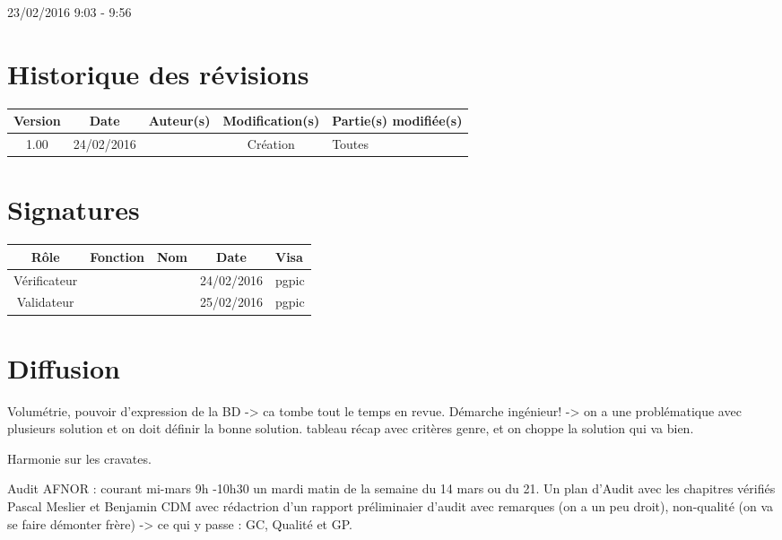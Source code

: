 \documentclass [a4paper] {article}
\begin{document}
\rhead{}

23/02/2016
\hfill   
\hfill 	9:03 - 9:56 				%



\section*{Historique des révisions}
\begin{center}
			\begin{tabular}{| c | c | c | c | p{4cm} |}
				\hline
				\rowcolor{Gray}
				Version & Date & Auteur(s) & Modification(s) & Partie(s) modifiée(s)		 \\
				\hline
				1.00 & 24/02/2016 & \Pierre & Création & Toutes \\
		\hline		
			\end{tabular}
		\end{center}

\section*{Signatures}

		\begin{center}
			\begin{tabular}{| c | c | c | c | p{4cm} |}
				\hline
				\rowcolor{Gray}
				Rôle & Fonction & Nom & Date & Visa		 \\
				\hline
				Vérificateur & \RQA & \Kafui & 24/02/2016 & pgpic \\[30pt]
				\hline
				Validateur & \CP & \Sergi & 25/02/2016 & pgpic \\[30pt]	
				\hline
			\end{tabular}
		\end{center}


\section{Diffusion}
Volumétrie, pouvoir d'expression de la BD -> ca tombe tout le temps en revue.
Démarche ingénieur! -> on a une problématique avec plusieurs solution et on doit définir la bonne solution. tableau récap avec critères genre, et on choppe la solution qui va bien.

Harmonie sur les cravates.

Audit AFNOR : courant mi-mars
9h -10h30 un mardi matin de la semaine du 14 mars ou du 21. 
Un plan d'Audit avec les chapitres vérifiés Pascal Meslier et Benjamin CDM avec rédactrion d'un rapport préliminaier d'audit avec remarques (on a un peu droit), non-qualité (on va se faire démonter frère) -> ce qui y passe : GC, Qualité et GP.
\end{document}
